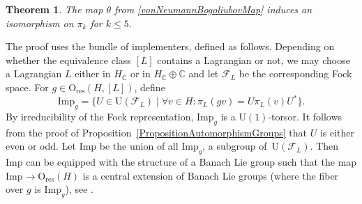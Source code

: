\documentclass[pdftex]{sigma}
\numberwithin{equation}{section}
\newtheorem{Theorem}{Theorem}[section]
\newcommand{\C}{\mathbb{C}}
\newcommand{\res}{\mathrm{res}}
\newcommand{\Imp}{\mathrm{Imp}}
\newcommand{\U}{\mathrm{U}}
\renewcommand{\O}{\mathrm{O}}
\begin{document}
\begin{Theorem} \label{TheoremIsoPileq2}
The map $\theta$ from \eqref{vonNeumannBogoliubovMap} induces an isomorphism on $\pi_k$ for $k \leq 5$.
\end{Theorem}

The proof uses the bundle of implementers, defined as follows.
Depending on whether the equivalence class $[L]$ contains a Lagrangian or not, we may choose a Lagrangian $L$ either in $H_\C$ or in $H_\C \oplus \C$ and let $\mathcal{F}_L$ be the corresponding Fock space.
For $g \in \O_{\res}(H, [L])$, define
\begin{equation*}
 \Imp_g = \{ U \in \U(\mathcal{F}_L) \mid \forall v \in H\colon \pi_L (g v) = U \pi_L(v) U^*\}.
\end{equation*}
By irreducibility of the Fock representation, $\Imp_g$ is a $\U(1)$-torsor.
It follows from the proof of Proposition~\ref{PropositionAutomorphismGroups} that $U$ is either even or odd.
Let $\Imp$ be the union of all $\Imp_g$, a subgroup of~$\U(\mathcal{F}_L)$.
Then $\Imp$ can be equipped with the structure of a Banach Lie group such that the map $\Imp \to \O_{\res}(H)$ is a central extension of Banach Lie groups (where the fiber over $g$ is $\Imp_g$), see \cite[Section~3.5]{KristelWaldorf1}.
\end{document}
